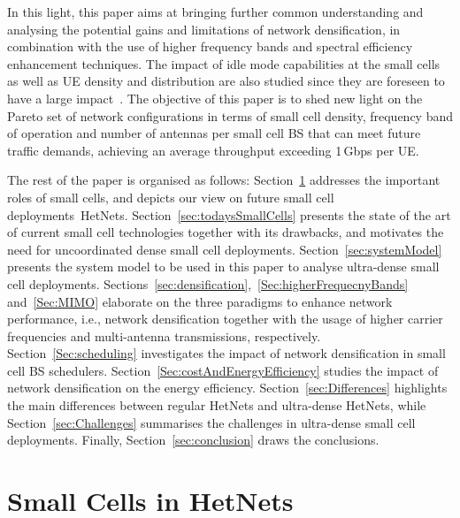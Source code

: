 \documentclass{IEEEtran}
\begin{document}
In this light, this paper aims at bringing further common understanding and
analysing the potential gains and limitations of network densification,
in combination with the use of higher frequency bands and spectral efficiency enhancement techniques.
The impact of idle mode capabilities at the small cells as well as \ac{UE} density and distribution are also studied
since they are foreseen to have a large impact~\cite{IdleMode2010}.
The objective of this paper is to shed new light on the Pareto set of network configurations in terms of
small cell density, frequency band of operation and number of antennas per small cell \ac{BS} that can meet future traffic demands,
achieving an average throughput exceeding 1\,Gbps per \ac{UE}.

The rest of the paper is organised as follows:
Section~\ref{sec:hetnet} addresses the important roles of small cells,
and depicts our view on future small cell deployments~\acp{HetNet}.
Section~\ref{sec:todaysSmallCells} presents the state of the art of current small cell technologies together with its drawbacks,
and motivates the need for uncoordinated dense small cell deployments.
Section~\ref{sec:systemModel} presents the system model to be used in this paper to analyse ultra-dense small cell deployments.
Sections~\ref{sec:densification},~\ref{Sec:higherFrequecnyBands} and~\ref{Sec:MIMO} elaborate on the three paradigms to enhance network performance,
i.e.,  network densification together with the usage of higher carrier frequencies and multi-antenna transmissions, respectively.
Section~\ref{Sec:scheduling} investigates the impact of network densification in small cell \ac{BS} schedulers.
Section~\ref{Sec:costAndEnergyEfficiency} studies the impact of network densification on the energy efficiency.
Section~\ref{sec:Differences} highlights  the main differences between regular HetNets and  ultra-dense HetNets,
while Section~\ref{sec:Challenges} summarises the challenges in ultra-dense small cell deployments.
Finally, Section~\ref{sec:conclusion} draws the conclusions.


\section{Small Cells in \acp{HetNet}}
\label{sec:hetnet}
\end{document}
